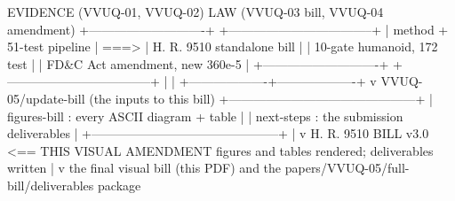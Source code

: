 \documentclass[11pt]{article}
\begin{document}
\begin{asciifig}
EVIDENCE (VVUQ-01, VVUQ-02)         LAW (VVUQ-03 bill, VVUQ-04 amendment) 
+----------------------------+      +-----------------------------------+
| method + 51-test pipeline  | ===> | H. R. 9510 standalone bill        |
| 10-gate humanoid, 172 test |      | FD&C Act amendment, new 360e-5    |
+----------------------------+      +-----------------------------------+
              |                                       |
              +-------------------+-------------------+
                                  v
            VVUQ-05/update-bill  (the inputs to this bill)
            +---------------------------------------------+
            | figures-bill : every ASCII diagram + table  |
            | next-steps   : the submission deliverables  |
            +---------------------------------------------+
                                  |
                                  v
           H. R. 9510 BILL v3.0  <== THIS VISUAL AMENDMENT
           figures and tables rendered; deliverables written
                                  |
                                  v
           the final visual bill (this PDF) and the
           papers/VVUQ-05/full-bill/deliverables package
\end{asciifig}
\vspace{-0.4cm}



{}

\label{toc:s1}


\end{document}
